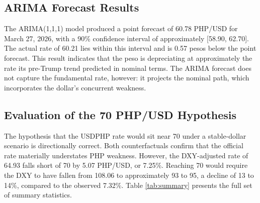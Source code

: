 \documentclass[12pt]{article}
\begin{document}
\subsection{ARIMA Forecast Results}

The ARIMA(1,1,1) model produced a point forecast of 60.78 PHP/USD for March 27,
2026, with a 90\% confidence interval of approximately [58.90, 62.70]. The actual
rate of 60.21 lies within this interval and is 0.57 pesos below the point forecast.
This result indicates that the peso is depreciating at approximately the rate its
pre-Trump trend predicted in nominal terms. The ARIMA forecast does not capture
the fundamental rate, however: it projects the nominal path, which incorporates the
dollar's concurrent weakness.

\subsection{Evaluation of the 70 PHP/USD Hypothesis}

The hypothesis that the USDPHP rate would sit near 70 under a stable-dollar
scenario is directionally correct. Both counterfactuals confirm that the official
rate materially understates PHP weakness. However, the DXY-adjusted rate of 64.93
falls short of 70 by 5.07 PHP/USD, or 7.25\%. Reaching 70 would require the DXY
to have fallen from 108.06 to approximately 93 to 95, a decline of 13 to 14\%,
compared to the observed 7.32\%. Table \ref{tab:summary} presents the full set
of summary statistics.
\end{document}
